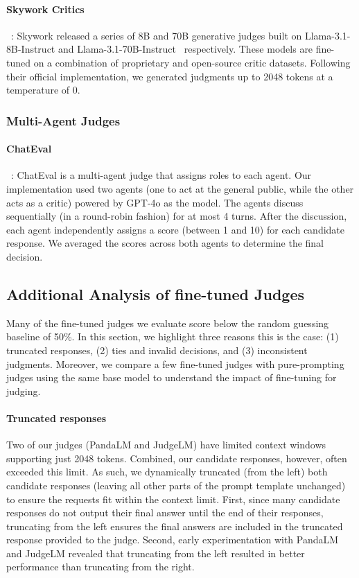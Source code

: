\documentclass{article} %
\begin{document}
\paragraph{Skywork Critics}~\citep{skyworkcritic2024}: Skywork released a series of 8B and 70B generative judges built on Llama-3.1-8B-Instruct and Llama-3.1-70B-Instruct~\citep{dubey2024llama3} respectively. These models are fine-tuned on a combination of proprietary and open-source critic datasets. Following their official implementation, we generated judgments up to 2048 tokens at a temperature of 0.

\subsubsection{Multi-Agent Judges}
\paragraph{ChatEval}~\citep{chan2023chateval}: ChatEval is a multi-agent judge that assigns roles to each agent. Our implementation used two agents (one to act at the general public, while the other acts as a critic) powered by GPT-4o as the model. The agents discuss sequentially (in a round-robin fashion) for at most 4 turns. After the discussion, each agent independently assigns a score (between 1 and 10) for each candidate response. We averaged the scores across both agents to determine the final decision.

\subsection{Additional Analysis of fine-tuned Judges}
\label{appendix:fine-tuned-anaylsis}
Many of the fine-tuned judges we evaluate score below the random guessing baseline of 50\%. In this section, we highlight three reasons this is the case: (1) truncated responses, (2) ties and invalid decisions, and (3) inconsistent judgments. Moreover, we compare a few fine-tuned judges with pure-prompting judges using the same base model to understand the impact of fine-tuning for judging.

\paragraph{Truncated responses} Two of our judges (PandaLM and JudgeLM) have limited context windows supporting just 2048 tokens. Combined, our candidate responses, however, often exceeded this limit. As such, we dynamically truncated (from the left) both candidate responses (leaving all other parts of the prompt template unchanged) to ensure the requests fit within the context limit. First, since many candidate responses do not output their final answer until the end of their responses, truncating from the left ensures the final answers are included in the truncated response provided to the judge. Second, early experimentation with PandaLM and JudgeLM revealed that truncating from the left resulted in better performance than truncating from the right.
\end{document}
